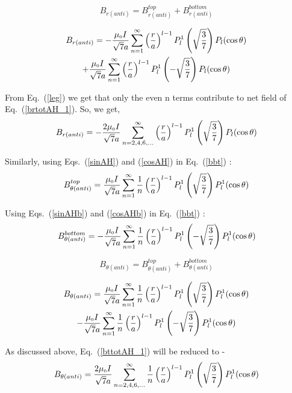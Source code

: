 $$B_{r(anti)}=B_{r(anti)}^{top}+B_{r(anti)}^{bottom}$$

\begin{multline}\label{brtotAH_1}
    B_{r(anti)}=-\frac{\mu_{\scriptscriptstyle 0} I }{\sqrt{7}a}\sum_{n=1}^{\infty} \left(\frac{r}{a}\right)^{l-1}P_l^1\left(\sqrt{\frac{3}{7}}\right) P_l(\cos\theta) \\+\frac{\mu_{\scriptscriptstyle 0} I }{\sqrt{7}a}\sum_{n=1}^{\infty} \left(\frac{r}{a}\right)^{l-1}P_l^1\left(-\sqrt{\frac{3}{7}}\right) P_l(\cos\theta)
\end{multline}

From Eq.~(\ref{leg}) we get that only the even n terms contribute to net field of Eq.~(\ref{brtotAH_1}). So, we get,
\begin{equation}\label{brtotAH}
B_{r(anti)}=-\frac{2 \mu_{\scriptscriptstyle 0} I }{\sqrt{7}a}\sum_{n=2,4,6,...}^{\infty}
\left(\frac{r}{a}\right)^{l-1}P_l^1\left(\sqrt{\frac{3}{7}}\right) P_l(\cos\theta)
\end{equation}


Similarly, using Eqs.~(\ref{sinAH}) and (\ref{cosAH}) in Eq.~(\ref{bbt}) :
\begin{equation}\label{bbtAH}
B_{\theta(anti)}^{top}=\frac{\mu_{\scriptscriptstyle 0} I }{\sqrt{7}a}\sum_{n=1}^{\infty} \frac{1}{n}\left(\frac{r}{a}\right)^{l-1}P_l^1\left(\sqrt{\frac{3}{7}}\right) P_l^1(\cos\theta)
\end{equation}

Using Eqs.~(\ref{sinAHb}) and (\ref{cosAHb}) in Eq.~(\ref{bbt}) :
\begin{equation}\label{bbtAHb}
B_{\theta(anti)}^{bottom}=-\frac{\mu_{\scriptscriptstyle 0} I }{\sqrt{7}a}\sum_{n=1}^{\infty}\frac{1}{n} \left(\frac{r}{a}\right)^{l-1}P_l^1\left(-\sqrt{\frac{3}{7}}\right) P_l^1(\cos\theta)
\end{equation}


$$B_{\theta(anti)}=B_{\theta(anti)}^{top}+B_{\theta(anti)}^{bottom}$$

\begin{multline}\label{bttotAH_1}
    B_{\theta(anti)}=\frac{\mu_{\scriptscriptstyle 0} I }{\sqrt{7}a}\sum_{n=1}^{\infty} \frac{1}{n}\left(\frac{r}{a}\right)^{l-1}P_l^1\left(\sqrt{\frac{3}{7}}\right) P_l^1(\cos\theta) \\-\frac{\mu_{\scriptscriptstyle 0} I }{\sqrt{7}a}\sum_{n=1}^{\infty}\frac{1}{n} \left(\frac{r}{a}\right)^{l-1}P_l^1\left(-\sqrt{\frac{3}{7}}\right) P_l^1(\cos\theta)
\end{multline}


As discussed above, Eq.~(\ref{bttotAH_1}) will be reduced to -
\begin{equation}\label{bttotAH}
B_{\theta(anti)}=\frac{2 \mu_{\scriptscriptstyle 0} I }{\sqrt{7}a}\sum_{n=2,4,6,...}^{\infty}
\frac{1}{n}\left(\frac{r}{a}\right)^{l-1}P_l^1\left(\sqrt{\frac{3}{7}}\right) P_l^1(\cos\theta)
\end{equation}